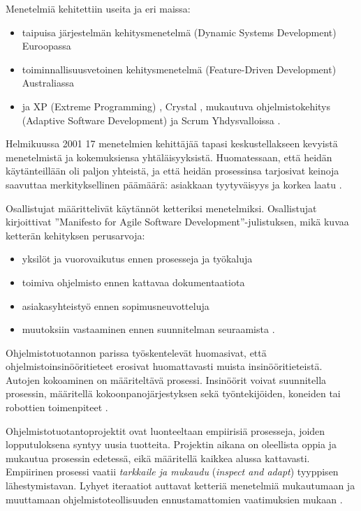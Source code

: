\documentclass[finnish]{tktltiki2}
\theoremstyle{definition}
\theoremstyle{remark}
\begin{document}
Menetelmiä kehitettiin useita ja eri maissa: 
\begin{itemize}
 \item taipuisa järjestelmän kehitysmenetelmä (Dynamic Systems Development) Euroopassa
 \item toiminnallisuusvetoinen kehitysmenetelmä (Feature-Driven Development) Australiassa
 \item ja XP (Extreme Programming) \cite{BEC99}, Crystal \cite{COC05}, mukautuva ohjelmistokehitys (Adaptive Software Development) ja Scrum \cite{SCH09} Yhdysvalloissa \cite{WIC03}.
\end{itemize}

Helmikuussa 2001 17 menetelmien kehittäjää tapasi keskustellakseen kevyistä menetelmistä ja kokemuksiensa yhtäläisyyksistä. Huomatessaan, että heidän käytänteillään oli paljon yhteistä, ja että heidän prosessinsa tarjosivat keinoja saavuttaa merkityksellinen päämäärä: asiakkaan tyytyväisyys ja korkea laatu \cite{WIC03}. 

Osallistujat määrittelivät käytännöt ketteriksi menetelmiksi.
Osallistujat kirjoittivat ''Manifesto for Agile Software Development''-julistuksen, mikä kuvaa ketterän kehityksen perusarvoja:

\begin{itemize}
 \item yksilöt ja vuorovaikutus ennen prosesseja ja työkaluja
 \item toimiva ohjelmisto ennen kattavaa dokumentaatiota
 \item asiakasyhteistyö ennen sopimusneuvotteluja
 \item muutoksiin vastaaminen ennen suunnitelman seuraamista \cite{WIC03}.
\end{itemize}

Ohjelmistotuotannon parissa työskentelevät huomasivat, että ohjelmistoinsinööritieteet erosivat huomattavasti muista insinööritieteistä. Autojen kokoaminen on määriteltävä prosessi. Insinöörit voivat suunnitella prosessin, määritellä kokoonpanojärjestyksen sekä työntekijöiden, koneiden tai robottien toimenpiteet \cite{WIC03}.

Ohjelmistotuotantoprojektit ovat luonteeltaan empiirisiä prosesseja, joiden lopputuloksena syntyy uusia tuotteita. Projektin aikana on oleellista oppia ja mukautua prosessin edetessä, eikä määritellä kaikkea alussa kattavasti. Empiirinen prosessi vaatii \textit{tarkkaile ja mukaudu} (\textit{inspect and adapt}) tyyppisen lähestymistavan. Lyhyet iteraatiot auttavat ketteriä menetelmiä mukautumaan ja muuttamaan ohjelmistoteollisuuden ennustamattomien vaatimuksien mukaan \cite{WIC03}.
\end{document}
